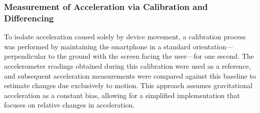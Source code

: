 \documentclass{article}
\begin{document}
    \subsubsection{Measurement of Acceleration via Calibration and Differencing}
    To isolate acceleration caused solely by device movement, a calibration process
    was performed by maintaining the smartphone in a standard orientation—perpendicular
    to the ground with the screen facing the user—for one second. The
    accelerometer readings obtained during this calibration were used as a
    reference, and subsequent acceleration measurements were compared against this
    baseline to estimate changes due exclusively to motion. This approach
    assumes gravitational acceleration as a constant bias, allowing for a simplified
    implementation that focuses on relative changes in acceleration.
\end{document}
